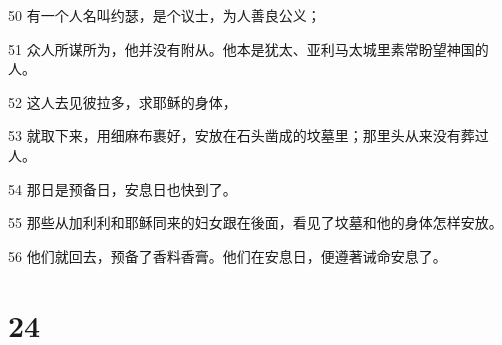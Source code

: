 \par 50 有一个人名叫约瑟，是个议士，为人善良公义；
\par 51 众人所谋所为，他并没有附从。他本是犹太、亚利马太城里素常盼望神国的人。
\par 52 这人去见彼拉多，求耶稣的身体，
\par 53 就取下来，用细麻布裹好，安放在石头凿成的坟墓里；那里头从来没有葬过人。
\par 54 那日是预备日，安息日也快到了。
\par 55 那些从加利利和耶稣同来的妇女跟在後面，看见了坟墓和他的身体怎样安放。
\par 56 他们就回去，预备了香料香膏。他们在安息日，便遵著诫命安息了。

\chapter{24}

